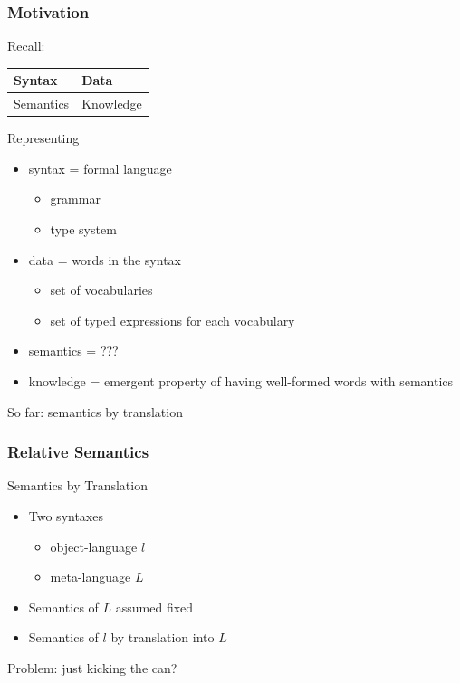 \begin{frame}\frametitle{Motivation}
Recall:

\begin{center}
\begin{tabular}{l|l}
Syntax & Data \\
\hline
Semantics & Knowledge
\end{tabular}
\end{center}

Representing
\begin{itemize}
\item syntax = formal language
\begin{itemize}
\item grammar  
\item type system 
\end{itemize}
\item data = words in the syntax
\begin{itemize}
\item set of vocabularies
\item set of typed expressions for each vocabulary
\end{itemize}
\item semantics = \alert{???}
\item knowledge = emergent property of having well-formed words with semantics
\end{itemize}

So far: semantics by translation
\end{frame}

\begin{frame}\frametitle{Relative Semantics}
Semantics by Translation
\begin{itemize}
\item Two syntaxes
\begin{itemize}
\item object-language $l$ 
\item meta-language $L$ 
\end{itemize}
\item Semantics of $L$ assumed fixed
\item Semantics of $l$ by translation into $L$
\end{itemize}

Problem: just kicking the can?
\end{frame}

